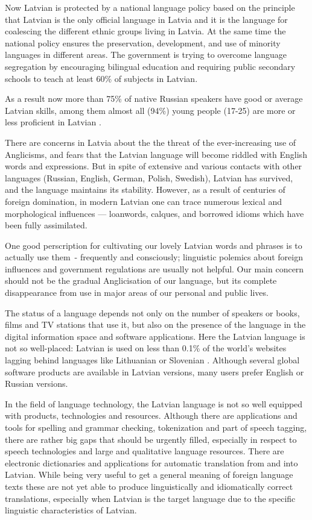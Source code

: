 \begin{multicols}{2}
Now Latvian is protected by a national language policy based on the principle that Latvian is the only official language in Latvia and it is the language for coalescing the  different ethnic groups living in Latvia.
At the same time the national policy ensures the preservation, development, and use of minority languages in different areas.
The government is trying to overcome language segregation by encouraging bilingual education and requiring public secondary schools to teach at least 60\% of subjects in Latvian. 

As a result now more than 75\% of native Russian speakers have good or average Latvian skills, among them almost all (94\%) young people (17-25) are more or less proficient in Latvian \cite{Meta3ES}. 

There are concerns in Latvia about the the threat of the ever-increasing use of Anglicisms, and fears that the Latvian language will become riddled with English words and expressions.
But in spite of extensive and various contacts with other languages (Russian, English, German, Polish, Swedish), Latvian has survived, and the language maintains its stability.
However, as a result of centuries of foreign domination, in modern Latvian one can trace numerous lexical and morphological influences — loanwords, calques, and borrowed idioms which have been fully assimilated. 

One good perscription for cultivating our lovely Latvian words and phrases is to actually use them~- frequently and consciously; linguistic polemics about foreign influences and government regulations are usually not helpful.
Our main concern should not be the gradual Anglicisation of our language, but its complete disappearance from use in major areas of our personal and public lives.
 
The status of a language depends not only on the number of speakers or books, films and TV stations that use it, but also on the presence of the language in the digital information space and software applications.
Here the Latvian language is not so well-placed: Latvian is used on less than 0.1\% of the world’s websites lagging behind languages like Lithuanian or Slovenian \cite{Meta4ES}.
Although several global software products are available in Latvian versions, many users prefer English or Russian versions.  

In the field of language technology, the Latvian language is not so well equipped with products, technologies and resources.
Although there are applications and tools for spelling and grammar checking, tokenization and part of speech tagging, there are rather big gaps that should be urgently filled, especially in respect to speech technologies and large and qualitative language resources.
There are electronic dictionaries and applications for automatic translation from and into Latvian.
While being very useful to get a general meaning of foreign language texts these are not yet able to produce linguistically and idiomatically correct translations, especially when Latvian is the target language due to the specific linguistic characteristics of Latvian.


\end{multicols}
